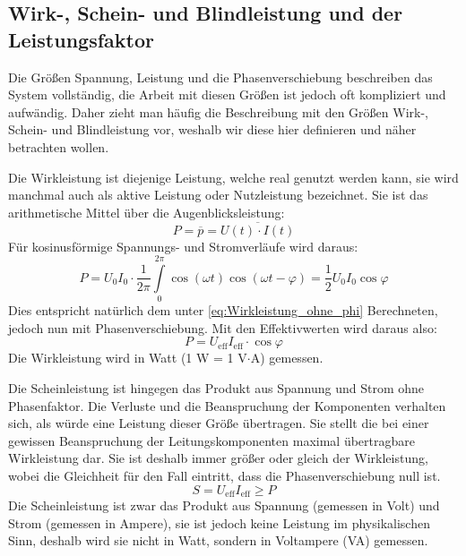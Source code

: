 \subsection{Wirk-, Schein- und Blindleistung und der Leistungsfaktor}
Die Größen Spannung, Leistung und die Phasenverschiebung beschreiben das System vollständig, die Arbeit mit diesen Größen ist jedoch oft kompliziert und aufwändig. Daher zieht man häufig die Beschreibung mit den Größen Wirk-, Schein- und Blindleistung vor, weshalb wir diese hier definieren und näher betrachten wollen.\cite{Harrison}

Die Wirkleistung ist diejenige Leistung, welche real genutzt werden kann, sie wird manchmal auch als aktive Leistung oder Nutzleistung bezeichnet. Sie ist das arithmetische Mittel über die Augenblicksleistung:
\begin{equation}
P = \overline{p} = \overline{U(t) \cdot I(t)}
\end{equation}
Für kosinusförmige Spannungs- und Stromverläufe wird daraus:
\begin{equation}
P = U_0 I_0 \cdot \frac{1}{2\pi} \int\limits_0^{2\pi} \cos\left( \omega t\right) \cos \left(\omega t - \varphi\right)
= \frac{1}{2} U_0 I_0 \cos \varphi
\end{equation}
Dies entspricht natürlich dem unter \eqref{eq:Wirkleistung_ohne_phi} Berechneten, jedoch nun mit Phasenverschiebung. Mit den Effektivwerten wird daraus also:
\begin{equation}
P =  U_{\mathrm{eff}} I_{\mathrm{eff}} \cdot \cos \varphi
\end{equation}
Die Wirkleistung wird in Watt (1 W = 1 V$\cdot$A) gemessen.

Die Scheinleistung ist hingegen das Produkt aus Spannung und Strom ohne Phasenfaktor. Die Verluste und die Beanspruchung der Komponenten verhalten sich, als würde eine Leistung dieser Größe übertragen. Sie stellt die bei einer gewissen Beanspruchung der Leitungskomponenten maximal übertragbare Wirkleistung dar. Sie ist deshalb immer größer oder gleich der Wirkleistung, wobei die Gleichheit für den Fall eintritt, dass die Phasenverschiebung null ist.\cite{Harrison}
\begin{equation}
S = U_{\mathrm{eff}} I_{\mathrm{eff}} \geq P
\end{equation}
Die Scheinleistung ist zwar das Produkt aus Spannung (gemessen in Volt) und Strom (gemessen in Ampere), sie ist jedoch keine Leistung im physikalischen Sinn, deshalb wird sie nicht in Watt, sondern in Voltampere (VA) gemessen.\cite{Harrison}

